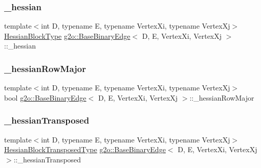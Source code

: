 \subsubsection{\texorpdfstring{\+\_\+hessian}{\_hessian}}
{\footnotesize\ttfamily template$<$int D, typename E, typename Vertex\+Xi, typename Vertex\+Xj$>$ \\
\mbox{\hyperlink{classg2o_1_1_base_binary_edge_a7eadbbe6abffe4d2ebdf6231272789a5}{Hessian\+Block\+Type}} \mbox{\hyperlink{classg2o_1_1_base_binary_edge}{g2o\+::\+Base\+Binary\+Edge}}$<$ D, E, Vertex\+Xi, Vertex\+Xj $>$\+::\+\_\+hessian\hspace{0.3cm}{\ttfamily [protected]}}

\mbox{\label{classg2o_1_1_base_binary_edge_aeb5c1f09a4433a6bd76ce4ab67bd9a64}} 
\subsubsection{\texorpdfstring{\+\_\+hessian\+Row\+Major}{\_hessianRowMajor}}
{\footnotesize\ttfamily template$<$int D, typename E, typename Vertex\+Xi, typename Vertex\+Xj$>$ \\
bool \mbox{\hyperlink{classg2o_1_1_base_binary_edge}{g2o\+::\+Base\+Binary\+Edge}}$<$ D, E, Vertex\+Xi, Vertex\+Xj $>$\+::\+\_\+hessian\+Row\+Major\hspace{0.3cm}{\ttfamily [protected]}}

\mbox{\label{classg2o_1_1_base_binary_edge_aa61657904b00fcfa19df382094386f11}} 
\subsubsection{\texorpdfstring{\+\_\+hessian\+Transposed}{\_hessianTransposed}}
{\footnotesize\ttfamily template$<$int D, typename E, typename Vertex\+Xi, typename Vertex\+Xj$>$ \\
\mbox{\hyperlink{classg2o_1_1_base_binary_edge_aec0d5b1819f702b7658574fcd6324b49}{Hessian\+Block\+Transposed\+Type}} \mbox{\hyperlink{classg2o_1_1_base_binary_edge}{g2o\+::\+Base\+Binary\+Edge}}$<$ D, E, Vertex\+Xi, Vertex\+Xj $>$\+::\+\_\+hessian\+Transposed\hspace{0.3cm}{\ttfamily [protected]}}

